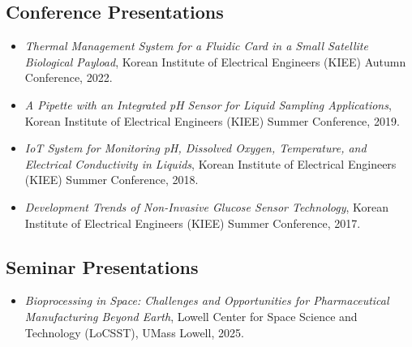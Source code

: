 \documentclass[letterpaper,11pt]{moderncv}
\begin{document}
\subsection{Conference Presentations}
\begin{sloppypar}
\begin{itemize}[leftmargin=1cm, itemsep=0pt, parsep=0pt]
    \item \textit{Thermal Management System for a Fluidic Card in a Small Satellite Biological Payload}, Korean Institute of Electrical Engineers (KIEE) Autumn Conference, 2022.
    \item \textit{A Pipette with an Integrated pH Sensor for Liquid Sampling Applications}, Korean Institute of Electrical Engineers (KIEE) Summer Conference, 2019.
    \item \textit{IoT System for Monitoring pH, Dissolved Oxygen, Temperature, and Electrical Conductivity in Liquids}, Korean Institute of Electrical Engineers (KIEE) Summer Conference, 2018.
    \item \textit{Development Trends of Non-Invasive Glucose Sensor Technology}, Korean Institute of Electrical Engineers (KIEE) Summer Conference, 2017.
\end{itemize}
\end{sloppypar}

\subsection{Seminar Presentations}
\begin{itemize}[leftmargin=0.5cm, itemsep=2pt, parsep=1pt]
    \item \textit{Bioprocessing in Space: Challenges and Opportunities for Pharmaceutical Manufacturing Beyond Earth}, Lowell Center for Space Science and Technology (LoCSST), UMass Lowell, 2025.
\end{itemize}

\vfill
{}
\end{document}
